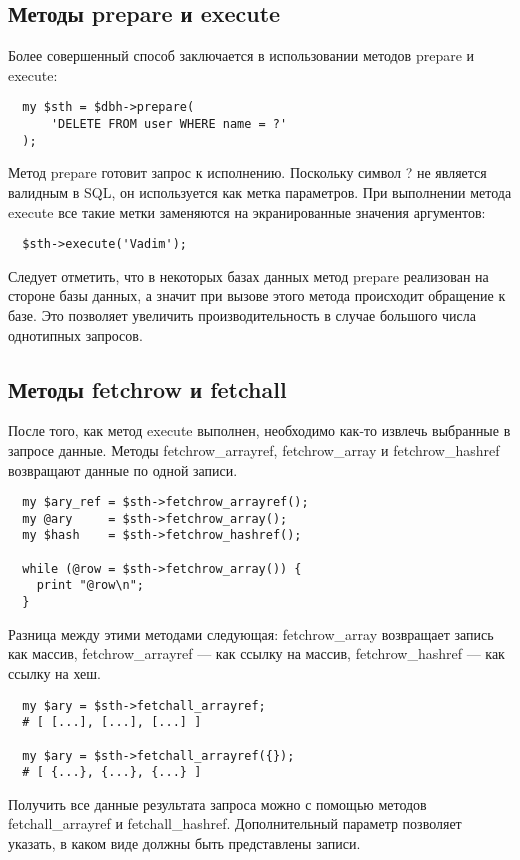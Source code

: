 \subsection{Методы prepare и execute}
Более совершенный способ заключается в использовании методов prepare и execute:
\begin{verbatim}
  my $sth = $dbh->prepare(
      'DELETE FROM user WHERE name = ?'
  );
\end{verbatim}
Метод prepare готовит запрос к исполнению. Поскольку символ ? не является валидным в SQL, он используется как метка параметров. При выполнении метода execute все такие метки заменяются на экранированные значения аргументов:
\begin{verbatim}
  $sth->execute('Vadim');
\end{verbatim}
Следует отметить, что в некоторых базах данных метод prepare реализован на стороне базы данных, а значит при вызове этого метода происходит обращение к базе. Это позволяет увеличить производительность в случае большого числа однотипных запросов.

\subsection{Методы fetchrow и fetchall}
После того, как метод execute выполнен, необходимо как-то извлечь выбранные в запросе данные. Методы fetchrow\_arrayref, fetchrow\_array и fetchrow\_hashref возвращают данные по одной записи.
\begin{verbatim}
  my $ary_ref = $sth->fetchrow_arrayref();
  my @ary     = $sth->fetchrow_array();
  my $hash    = $sth->fetchrow_hashref();

  while (@row = $sth->fetchrow_array()) {
    print "@row\n";
  }
\end{verbatim}
Разница между этими методами следующая: fetchrow\_array возвращает запись как массив, fetchrow\_arrayref --- как ссылку на массив, fetchrow\_hashref --- как ссылку на хеш.
\begin{verbatim}
  my $ary = $sth->fetchall_arrayref;
  # [ [...], [...], [...] ]

  my $ary = $sth->fetchall_arrayref({});
  # [ {...}, {...}, {...} ]
\end{verbatim}
Получить все данные результата запроса можно с помощью методов fetchall\_arrayref и fetchall\_hashref. Дополнительный параметр позволяет указать, в каком виде должны быть представлены записи.

